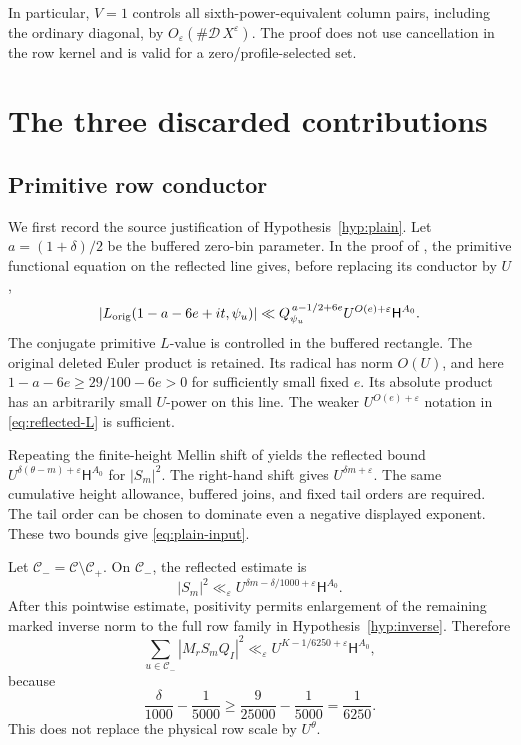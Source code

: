 \documentclass[11pt]{article}
\theoremstyle{definition}
\theoremstyle{remark}
\numberwithin{equation}{section}
\newcommand{\CC}{\mathcal C}
\newcommand{\HH}{\mathsf H}
\newcommand{\ee}{\varepsilon}
\begin{document}
In particular, $V=1$ controls all sixth-power-equivalent column
pairs, including the ordinary diagonal, by
$O_\ee(\#\mathcal D\,X^\ee)$. The proof does not use cancellation in
the row kernel and is valid for a zero/profile-selected set.

\section{The three discarded contributions}\label{sec:discard}

\subsection{Primitive row conductor}\label{sec:row-conductor}

We first record the source justification of Hypothesis~\ref{hyp:plain}.
Let $a=(1+\delta)/2$ be the buffered zero-bin parameter. In the proof
of \cite[Lemma 8.1]{openai}, the primitive functional equation on
the reflected line gives, before replacing its conductor by $U$,
\begin{equation}\label{eq:reflected-L}
|L_{\rm orig}(1-a-6e+it,\psi_u)|
\ll Q_{\psi_u}^{\,a-1/2+6e}
U^{O(e)+\ee}\HH^{A_0}.
\end{equation}
The conjugate primitive $L$-value is controlled in the buffered
rectangle. The original deleted Euler product is retained. Its radical
has norm $O(U)$, and here $1-a-6e\ge29/100-6e>0$ for sufficiently
small fixed $e$. Its absolute product has an arbitrarily small
$U$-power on this line. The weaker $U^{O(e)+\ee}$ notation in
\eqref{eq:reflected-L} is sufficient.

Repeating the finite-height Mellin shift of
\cite[Lemma 8.2]{openai} yields the reflected bound
$U^{\delta(\theta-m)+\ee}\HH^{A_0}$ for $|S_m|^2$.
The right-hand shift gives $U^{\delta m+\ee}$.
The same cumulative height allowance, buffered joins, and fixed
tail orders are required. The tail order can be chosen to dominate
even a negative displayed exponent. These two bounds give
\eqref{eq:plain-input}.

Let $\CC_-=\CC\setminus\CC_+$. On $\CC_-$, the reflected estimate is
\[
|S_m|^2\ll_\ee U^{\delta m-\delta/1000+\ee}\HH^{A_0}.
\]
After this pointwise estimate, positivity permits enlargement of the
remaining marked inverse norm to the full row family in
Hypothesis~\ref{hyp:inverse}. Therefore
\begin{equation}\label{eq:low-row}
\sum_{u\in\CC_-}|M_rS_mQ_I|^2
\ll_\ee U^{K-1/6250+\ee}\HH^{A_0},
\end{equation}
because
\[
\frac{\delta}{1000}-\frac1{5000}
\ge\frac{9}{25000}-\frac1{5000}=\frac1{6250}.
\]
This does not replace the physical row scale by $U^\theta$.
\end{document}
